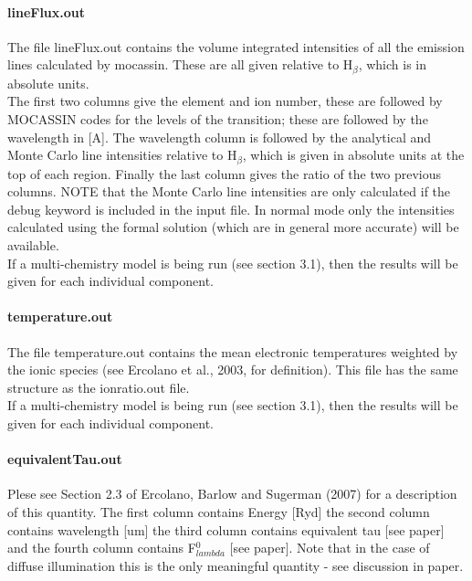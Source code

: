 \documentclass[11pt]{article}
\begin{document}
\paragraph{    lineFlux.out}
    The file lineFlux.out contains the volume integrated intensities of all the 
    emission lines calculated by {\sc mocassin}. These are all given relative to H$_{\beta}$, 
    which is in absolute units. \\
    The first two columns give the element and ion number, these are 
    followed by MOCASSIN codes for the levels of the transition; these are followed 
    by the wavelength in [A]. The wavelength column is followed by the analytical 
    and Monte Carlo line intensities relative to H$_{\beta}$, which is given in absolute
    units at the top of each region. Finally the last column gives the ratio of 
    the two previous columns. NOTE that the Monte Carlo line intensities are only 
    calculated if the debug keyword is included in the input file. In normal mode
    only the intensities calculated using the formal solution (which are in general
    more accurate) will be available.\\
    If a multi-chemistry model is being run (see section 3.1), then the results 
    will be given for each individual component. \\

    
\paragraph{    temperature.out }
    The file temperature.out contains the mean electronic temperatures weighted by 
    the ionic species (see Ercolano et al., 2003, for definition). This file has the
    same structure as the ionratio.out file. \\
    If a multi-chemistry model is being run (see section 3.1), then the results 
    will be given for each individual component.\\ 


\paragraph{ equivalentTau.out} Plese see Section 2.3 of Ercolano, Barlow and Sugerman 
    (2007) for a description of this quantity. The first column contains 
    Energy [Ryd]  the second column contains wavelength [um] the third column contains 
    equivalent tau [see paper] and the fourth column contains  F$_{lambda}^0$ [see paper]. 
    Note that in the case of diffuse illumination this is the only meaningful quantity - 
    see discussion in paper.\\
    
\end{document}
